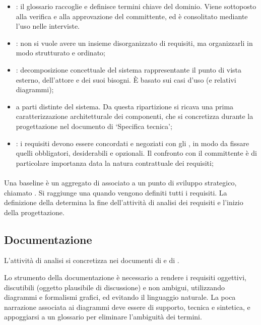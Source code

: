 \begin{itemize}
  \item {}: il glossario raccoglie e definisce
    termini chiave del dominio. Viene sottoposto alla verifica e alla
    approvazione del committente, ed è consolitato mediante l'uso
    nelle interviste.
  \item {}: non si vuole avere un
    insieme disorganizzato di requisiti, ma organizzarli in modo
    strutturato e ordinato;
  \item {}: 
    decomposizione concettuale del sistema rappresentante il punto di vista
    esterno, dell'attore e dei suoi bisogni. È basato sui casi d'uso (e
    relativi diagrammi);
  \item {} a parti distinte del sistema.
  Da questa ripartizione si ricava una prima caratterizzazione architetturale
  dei componenti, che si concretizza durante la progettazione nel documento di
  `Specifica tecnica';
  \item {}:
    i requisiti devono essere concordati e negoziati con gli
    , in modo da fissare quelli obbligatori, desiderabili
    e opzionali. Il confronto con il committente è di particolare importanza
    data la natura contrattuale dei requisiti;
\end{itemize}

\paragraph{}
\label{par:requirements_baseline}

Una baseline è un aggregato di  associato a un
punto di sviluppo strategico, chiamato . Si raggiunge una
 quando vengono definiti tutti i requisiti.
La definizione della  determina la fine
dell'attività di analisi dei requisiti e l'inizio della progettazione.

\subsection{Documentazione}
\label{sub:documentazione}

L'attività di analisi si concretizza nei documenti di 
e di .

Lo strumento della documentazione è necessario a rendere i requisiti oggettivi,
discutibili (oggetto plausibile di discussione) e non ambigui, utilizzando
diagrammi e formalismi grafici, ed evitando il linguaggio naturale. La poca
narrazione associata ai diagrammi deve essere di supporto, tecnica e sintetica,
e appoggiarsi a un glossario per eliminare l'ambiguità dei termini.

